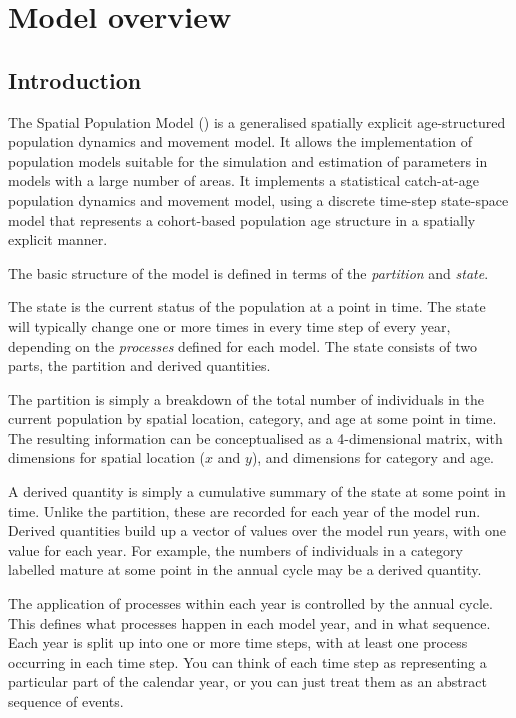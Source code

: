 \section{Model overview\label{sec:overview}}

\subsection{Introduction}

The Spatial Population Model (\SPM) is a generalised spatially explicit age-structured population dynamics and movement model. It allows the implementation of population models suitable for the simulation and estimation of parameters in models with a large number of areas. It implements a statistical catch-at-age population dynamics and movement model, using a discrete time-step state-space model that represents a cohort-based population age structure in a spatially explicit manner. 

The basic structure of the model is defined in terms of the \emph{partition} and \emph{state}. 

The state is the current status of the population at a point in time. The state will typically change one or more times in every time step of every year, depending on the \emph{processes} defined for each model. The state consists of two parts, the partition and derived quantities. 

The partition is simply a breakdown of the total number of individuals in the current population by spatial location, category, and age at some point in time. The resulting information can be conceptualised as a 4-dimensional matrix, with dimensions for spatial location ($x$ and $y$), and dimensions for category and age. 

A derived quantity is simply a cumulative summary of the state at some point in time. Unlike the partition, these are recorded for each year of the model run. Derived quantities build up a vector of values over the model run years, with one value for each year. For example, the numbers of individuals in a category labelled mature at some point in the annual cycle may be a derived quantity. 

The application of processes within each year is controlled by the annual cycle. This defines what processes happen in each model year, and in what sequence. Each year is split up into one or more time steps, with at least one process occurring in each time step. You can think of each time step as representing a particular part of the calendar year, or you can just treat them as an abstract sequence of events.


